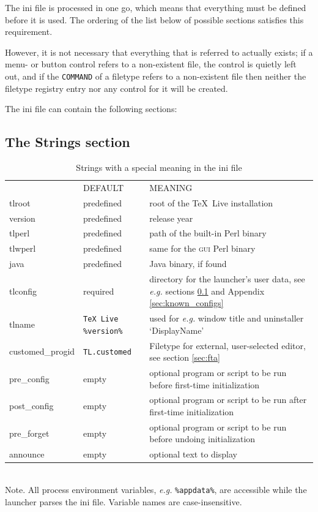 \documentclass[11pt,a4paper,oneside]{report}
\def\TL{\TeX~Live}
\def\mysc#1{{\rmfamily\textsc{#1}}}
\def\GUI{\mysc{gui}}
\begin{document}
The ini file is processed in one go, which means that everything
must be defined before it is used. The ordering of the list below of
possible sections satisfies this requirement.

However, it is not necessary that everything that is referred to
actually exists; if a menu- or button control refers to a
non-existent file, the control is quietly left out, and if the
\texttt{COMMAND} of a filetype refers to a non-existent file then
neither the filetype registry entry nor any control for it will be
created.

The ini file can contain the following sections:

\subsection{The Strings section}
\label{sec:strings}

\begin{table}[tb]
  \centering
{\small
{}\sffamily\noindent
\begin{tabular}{|>{\ttfamily}llP{2in}|}
  \hline
  & DEFAULT & MEANING \\
  tlroot & predefined & root of the \TL{} installation \\
  version & predefined & release year \\
  tlperl & predefined & path of the built-in Perl binary \\
  tlwperl & predefined & same for the \GUI{} Perl binary \\
  java & predefined & Java binary, if found \\
  tlconfig & required & directory for the launcher's user data, see \emph{e.g.}
     sections \ref{sec:strings} and Appendix \ref{sec:known_configs} \\
  tlname & \texttt{TeX Live \%version\%} & used for \emph{e.g.}
      window title and uninstaller `DisplayName' \\
  customed\_progid & \texttt{TL.customed} & Filetype
      for external, user-selected editor, see section \ref{sec:fta} \\
  pre\_config & empty & optional program or script to be run before
      first-time initialization \\
  post\_config & empty & optional program or script to be run after
      first-time initialization \\
  pre\_forget & empty & optional program or script to be run before
      undoing initialization \\
  announce & empty & optional text to display \\[3pt]
  \hline
\end{tabular} \\[3pt]
Note. All process environment variables, \emph{e.g.}
\texttt{\%appdata\%}, are accessible while the
launcher parses the ini file. Variable names are case-insensitive.\par}

\caption{Strings with a special meaning in the ini file}
\label{tab:strings}
\end{table}
\end{document}
